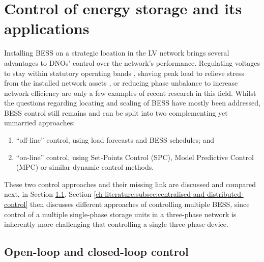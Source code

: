 \section{Control of energy storage and its applications}
\label{ch-literature:sec:control-of-energy-storage}

Installing BESS on a strategic location in the LV network brings several advantages to DNOs' control over the network's performance.
Regulating voltages to stay within statutory operating bands \cite{Yang2014}, shaving peak load to relieve stress from the installed network assets \cite{Bennett2015}, or reducing phase unbalance to increase network efficiency \cite{Wang2015b} are only a few examples of recent research in this field.
Whilst the questions regarding locating and scaling of BESS have mostly been addressed, BESS control still remains and can be split into two complementing yet unmarried approaches:

\begin{enumerate}
	\item ``off-line'' control, using load forecasts and BESS schedules; and
	\item ``on-line'' control, using Set-Points Control (SPC), Model Predictive Control (MPC) or similar dynamic control methods.
\end{enumerate}

These two control approaches and their missing link are discussed and compared next, in Section \ref{ch-literature:subsec:open-loop-and-closed-loop-control}.
Section \ref{ch-literature:subsec:centralised-and-distributed-control} then discusses different approaches of controlling multiple BESS, since control of a multiple single-phase storage units in a three-phase network is inherently more challenging that controlling a single three-phase device.

\subsection{Open-loop and closed-loop control}
\label{ch-literature:subsec:open-loop-and-closed-loop-control}

